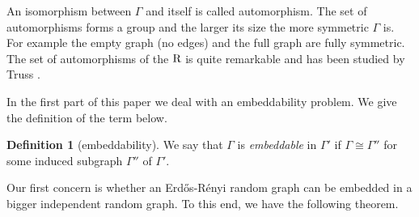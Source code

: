 \documentclass[reqno]{amsart}
\theoremstyle{theorem}
\theoremstyle{definition}
\newtheorem{definition}[theorem]{Definition}
\theoremstyle{remark}
\newcommand{\1}{{\text{\Large $\mathfrak 1$}}}	%
\numberwithin{equation}{section}
\def\II{\mathscr I}
\def\Rado{\text{\textsf{\textbf{R}}}}
\begin{document}
An isomorphism between $\Gamma$ and itself is called automorphism.
The set of automorphisms forms a group and the larger its size the more
symmetric $\Gamma$ is. For example the empty graph (no edges)
and the full graph are fully symmetric. The set of automorphisms of the
$\Rado$ is quite remarkable and has been studied by Truss \cite{TR85}.


In the first part of this paper we deal with an embeddability problem.
We give the definition of the term below.
\begin{definition}[embeddability]
We say that $\Gamma$ is {\em embeddable} in $\Gamma'$ if $\Gamma \cong 
\Gamma''$ for some induced subgraph $\Gamma''$ of $\Gamma'$.
\end{definition}

Our first concern is whether an Erd\H{o}s-R\'enyi random graph
can be embedded in a bigger independent random graph.
To this end, we have the following theorem.
\end{document}
